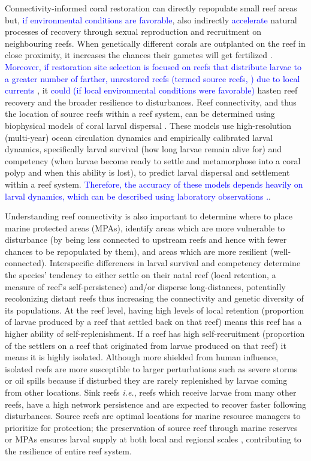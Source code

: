 \documentclass[preprint,12pt,authoryear]{elsarticle}
\newcommand{\modif}[1]{\textcolor{blue}{#1}}
\begin{document}
	Connectivity-informed coral restoration can directly repopulate small reef areas but, \modif{if environmental conditions are favorable}, also indirectly \modif{accelerate} natural processes of recovery through sexual reproduction and recruitment on neighbouring reefs. When genetically different corals are outplanted on the reef in close proximity, it increases the chances their gametes will get fertilized \citep{omori2019coral}. \modif{Moreover, if restoration site selection is focused on reefs that distribute larvae to a greater number of farther, unrestored reefs (termed source reefs, \citealp{bode2018resilient}) due to local currents} \citep{king2023larval}, it \modif{could (if local environmental conditions were favorable)} hasten reef recovery and the broader resilience to disturbances. Reef connectivity, and thus the location of source reefs within a reef system, can be determined using biophysical models of coral larval dispersal \modif{\citep{frys2020fine,figueiredo2022global,holstein2014consistency,holstein2022predicting,king2023larval}}. These models use high-resolution (multi-year) ocean circulation dynamics and empirically calibrated larval dynamics, specifically larval survival (how long larvae remain alive for) and competency (when larvae become ready to settle and metamorphose into a coral polyp and when this ability is lost), to predict larval dispersal and settlement within a reef system. \modif{Therefore, the accuracy of these models depends heavily on larval dynamics, which can be described using laboratory observations \citep{limer2024life}.}.
	
	Understanding reef connectivity is also important to determine where to place marine protected areas (MPAs), identify areas which are more vulnerable to disturbance (by being less connected to upstream reefs and hence with fewer chances to be repopulated by them), and areas which are more resilient (well-connected). Interspecific differences in larval survival and competency determine the species’ tendency to either settle on their natal reef (local retention, a measure of reef’s self-persistence) and/or disperse long-distances, potentially recolonizing distant reefs thus increasing the connectivity and genetic diversity of its populations. At the reef level, having high levels of local retention (proportion of larvae produced by a reef that settled back on that reef) means this reef has a higher ability of self-replenishment. If a reef has high self-recruitment (proportion of the settlers on a reef that originated from larvae produced on that reef) it means it is highly isolated.  Although more shielded from human influence, isolated reefs are more susceptible to larger perturbations such as severe storms or oil spills \citep{baumann2022remoteness} because if disturbed they are rarely replenished by larvae coming from other locations. Sink reefs \textit{i.e.}, reefs which receive larvae from many other reefs, have a high network persistence and are expected to recover faster following disturbances. Source reefs are optimal locations for marine resource managers to prioritize for protection; the preservation of source reef through marine reserves or MPAs ensures larval supply at both local and regional scales \citep{muenzel2023integrating}, contributing to the resilience of entire reef system.
	
\end{document}
